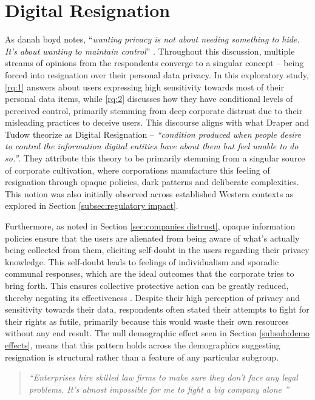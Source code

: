 \section{Digital Resignation} \label{sec: resignation}

As danah boyd notes, ``\textit{wanting privacy is not about needing something to hide. It's about wanting to maintain control}'' \cite{boyd2010making}. Throughout this discussion, multiple streams of opinions from the respondents converge to a singular concept – being forced into resignation over their personal data privacy. In this exploratory study, \ref{rq:1} answers about users expressing high sensitivity towards most of their personal data items, while \ref{rq:2} discusses how they have conditional levels of perceived control, primarily stemming from deep corporate distrust due to their misleading practices to deceive users. This discourse aligns with what Draper and Tudow theorize as Digital Resignation – \textit{``condition produced when people desire to control the information digital entities have about them but feel unable to do so.''}\cite{draper_corporate_2019}. They attribute this theory to be primarily stemming from a singular source of corporate cultivation, where corporations manufacture this feeling of resignation through opaque policies, dark patterns and deliberate complexities. This notion was also initially observed across established Western contexts as explored in Section \ref{subsec:regulatory impact}. 

 Furthermore, as noted in Section \ref{sec:companies distrust}, opaque information policies ensure that the users are alienated from being aware of what's actually being collected from them, eliciting self-doubt in the users regarding their privacy knowledge. This self-doubt leads to feelings of individualism and sporadic communal responses, which are the ideal outcomes that the corporate tries to bring forth. This ensures collective protective action can be greatly reduced, thereby negating its effectiveness \cite{draper_corporate_2019}. Despite their high perception of privacy and sensitivity towards their data, respondents often stated their attempts to fight for their rights as futile, primarily because this would waste their own resources without any end result. The null demographic effect seen in Section \ref{subsub:demo effects}, means that this pattern holds across the demographics suggesting resignation is structural rather than a feature of any particular subgroup.

\begin{quote}
    \textit{``Enterprises hire skilled law firms to make sure they don't face any legal problems. It's almost impossible for me to fight a big company alone ''}
\end{quote}

